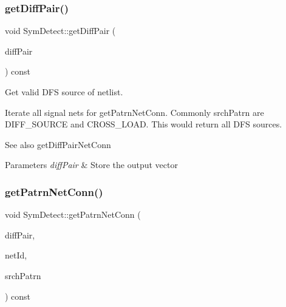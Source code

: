 \subsubsection{\texorpdfstring{get\+Diff\+Pair()}{getDiffPair()}}
{\footnotesize\ttfamily void Sym\+Detect\+::get\+Diff\+Pair (\begin{DoxyParamCaption}\item[{std\+::vector$<$ \hyperlink{classMosPair}{Mos\+Pair} $>$ \&}]{diff\+Pair }\end{DoxyParamCaption}) const\hspace{0.3cm}{\ttfamily [private]}}



Get valid D\+FS source of netlist. 

Iterate all signal nets for get\+Patrn\+Net\+Conn. Commonly srch\+Patrn are D\+I\+F\+F\+\_\+\+S\+O\+U\+R\+CE and C\+R\+O\+S\+S\+\_\+\+L\+O\+AD. This would return all D\+FS sources.

\begin{DoxySeeAlso}{See also}
get\+Diff\+Pair\+Net\+Conn 
\end{DoxySeeAlso}

\begin{DoxyParams}{Parameters}
{\em diff\+Pair} & Store the output vector \\
\hline
\end{DoxyParams}
\mbox{\label{classSymDetect_aa6d2ec13048f8f7e18e659bf8ac31dee}} 
\subsubsection{\texorpdfstring{get\+Patrn\+Net\+Conn()}{getPatrnNetConn()}}
{\footnotesize\ttfamily void Sym\+Detect\+::get\+Patrn\+Net\+Conn (\begin{DoxyParamCaption}\item[{std\+::vector$<$ \hyperlink{classMosPair}{Mos\+Pair} $>$ \&}]{diff\+Pair,  }\item[{\hyperlink{type_8h_a581e8093e28e7362f2b6937296190676}{Index\+Type}}]{net\+Id,  }\item[{\hyperlink{type_8h_af19eddb079bfea723256710b029c38e8}{Mos\+Pattern}}]{srch\+Patrn }\end{DoxyParamCaption}) const\hspace{0.3cm}{\ttfamily [private]}}



